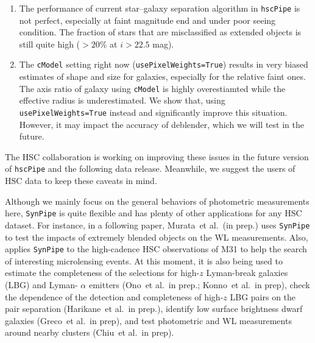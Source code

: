 \documentclass[useamsfonts]{pasj01}
\def\etal{{\ et al.~}}
\def\hscpipe{\texttt{hscPipe}}
\def\synpipe{\texttt{SynPipe}}
\def\cmodel{\texttt{cModel}}
\begin{document}
    \begin{enumerate}

        \item The performance of current star--galaxy separation algorithm in \hscpipe{}
            is not perfect, especially at faint magnitude end and under poor seeing
            condition.
            The fraction of stars that are misclassified as extended objects is still
            quite high ($>20$\% at $i> 22.5$ mag).

        \item The \cmodel{} setting right now (\texttt{usePixelWeights=True}) results
            in very biased estimates of shape and size for galaxies, especially for the
            relative faint ones.
            The axis ratio of galaxy using \cmodel{} is highly overestiamted while
            the effective radius is underestimated.
            We show that, using \texttt{usePixelWeights=True} instead and significantly
            improve this situation.
            However, it may impact the accuracy of deblender, which we will test in the
            future.

    \end{enumerate}

    The HSC collaboration is working on improving these issues in the future version
    of \hscpipe{} and the following data release.
    Meanwhile, we suggest the users of HSC data to keep these caveats in mind.

    Although we mainly focus on the general behaviors of photometric measurements here,
    \synpipe{} is quite flexible and has plenty of other applications for any HSC
    dataset.
    For instance, in a following paper, Murata\etal (in prep.) uses \synpipe{} to test
    the impacts of extremely blended objects on the WL measurements.
    Also, \citep{Niikura2017} applies \synpipe{} to the high-cadence HSC observations
    of M31 to help the search of interesting microlensing events.
    At this moment, it is also being used to estimate the completeness of the selections 
    for high-$z$ Lyman-break galaxies (LBG) and Lyman- $\alpha$ emitters 
    (Ono\etal in prep.; Konno\etal in prep), check the dependence of the detection and 
    completeness of high-$z$ LBG pairs on the pair separation (Harikane\etal in prep.),
    identify low surface brightness dwarf galaxies (Greco\etal in prep),
    and test photometric and WL measurements around nearby clusters (Chiu\etal in prep).
\end{document}
